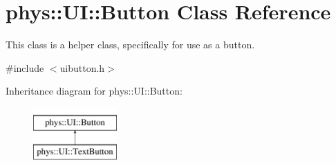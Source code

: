 \hypertarget{classphys_1_1UI_1_1Button}{
\section{phys::UI::Button Class Reference}
\label{d8/d88/classphys_1_1UI_1_1Button}
}


This class is a helper class, specifically for use as a button.  




{\ttfamily \#include $<$uibutton.h$>$}

Inheritance diagram for phys::UI::Button:\begin{figure}[H]
\begin{center}
\leavevmode
\includegraphics[height=2.000000cm]{d8/d88/classphys_1_1UI_1_1Button}
\end{center}
\end{figure}
